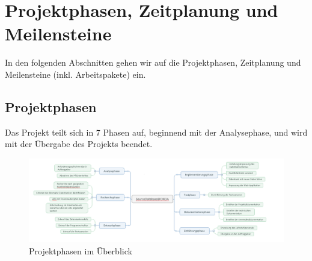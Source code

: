 \chapter*{Projektphasen, Zeitplanung und Meilensteine}
In den folgenden Abschnitten gehen wir auf die Projektphasen, Zeitplanung und Meilensteine (inkl. Arbeitspakete) ein.

\section*{Projektphasen}
Das Projekt teilt sich in 7 Phasen auf, beginnend mit der Analysephase, und wird mit der Übergabe des Projekts beendet.
\begin{figure}[h]
\centering
\includegraphics[scale=0.385]{bilder/Projektuebersicht.png}
\caption*{Projektphasen im Überblick}
\end{figure}

